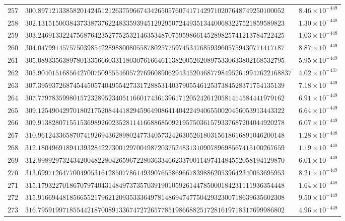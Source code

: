 \documentclass[12pt,reqno]{amsart}
\theoremstyle{remark}
\begin{document}
\begin{longtable}{clc}
$257$ & $300.8971213385820142451212637596674342650576074171429710207648749250100052$ & $8.46\times 10^{-449}$ \\
$258$ & $302.1315150038437338737622483359394512929507244935134400683227521859589823$ & $1.30\times 10^{-448}$ \\
$259$ & $303.2469133224756876423527752532146353487075959866145289825741213784722425$ & $1.03\times 10^{-448}$ \\
$260$ & $304.0479914575750398542289880080558780257759745347685939605759430771417187$ & $8.87\times 10^{-449}$ \\
$261$ & $305.0893356389780133566603311803076166461138200526208975330633802168532795$ & $5.95\times 10^{-449}$ \\
$262$ & $305.904015168564270075095554605727696089062943452046877984952619947622168837$ & $4.02\times 10^{-437}$ \\
$263$ & $307.3959372687454450574049554273317288531403790554612537384528371754135139$ & $7.18\times 10^{-449}$ \\
$264$ & $307.7797835998015723289523405116601743613961712052426120581414584441979162$ & $6.91\times 10^{-449}$ \\
$265$ & $309.1254904297018021752084441829459649086414042249406550020456053913443322$ & $6.64\times 10^{-449}$ \\
$266$ & $309.9138280715515369892602352811416688685092195750361579337687204044920278$ & $6.07\times 10^{-449}$ \\
$267$ & $310.9612433658707419269436289802477340573242630526180315618616891046200148$ & $1.28\times 10^{-448}$ \\
$268$ & $312.1804969189413932842273001297004987203752483131090789698567415100267659$ & $1.19\times 10^{-448}$ \\
$269$ & $312.8989297324342004822804265967228036334662337001149741484552058194129870$ & $6.01\times 10^{-449}$ \\
$270$ & $313.6997126477004905316128507786149390765586966783988620539642340053695953$ & $8.21\times 10^{-449}$ \\
$271$ & $315.1793227018670797404314849737357039190105926144785000184231111936354448$ & $1.64\times 10^{-448}$ \\
$272$ & $315.9166944818566552179621209353336497814869474775042932300718639635602308$ & $9.50\times 10^{-449}$ \\
$273$ & $316.7959199718554421870089133674727265778519866882517281619718317699986802$ & $4.96\times 10^{-449}$ \\

\end{longtable}
\end{document}
